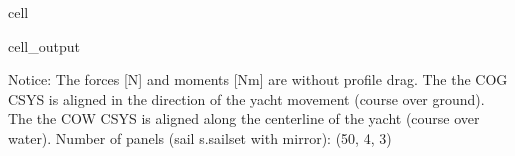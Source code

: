 \documentclass[a4paper,12pt,english]{jupyterBook}
\begin{document}
\begin{sphinxuseclass}{cell}
\begin{sphinxVerbatimOutput}
\begin{sphinxuseclass}{cell_output}
\begin{sphinxVerbatim}[commandchars=\\\{\}]
\PYGZhy{}\PYGZhy{}\PYGZhy{}\PYGZhy{}\PYGZhy{}\PYGZhy{}\PYGZhy{}\PYGZhy{}\PYGZhy{}\PYGZhy{}\PYGZhy{}\PYGZhy{}\PYGZhy{}\PYGZhy{}\PYGZhy{}\PYGZhy{}\PYGZhy{}\PYGZhy{}\PYGZhy{}\PYGZhy{}\PYGZhy{}\PYGZhy{}\PYGZhy{}\PYGZhy{}\PYGZhy{}\PYGZhy{}\PYGZhy{}\PYGZhy{}\PYGZhy{}\PYGZhy{}\PYGZhy{}\PYGZhy{}\PYGZhy{}\PYGZhy{}\PYGZhy{}\PYGZhy{}\PYGZhy{}\PYGZhy{}\PYGZhy{}\PYGZhy{}\PYGZhy{}\PYGZhy{}\PYGZhy{}\PYGZhy{}\PYGZhy{}\PYGZhy{}\PYGZhy{}\PYGZhy{}\PYGZhy{}\PYGZhy{}\PYGZhy{}\PYGZhy{}\PYGZhy{}\PYGZhy{}\PYGZhy{}\PYGZhy{}\PYGZhy{}\PYGZhy{}\PYGZhy{}\PYGZhy{}\PYGZhy{}
Notice:
	The forces [N] and moments [Nm] are without profile drag.
	The the \PYGZus{}COG\PYGZus{} CSYS is aligned in the direction of the yacht movement (course over ground).
	The the \PYGZus{}COW\PYGZus{} CSYS is aligned along the centerline of the yacht (course over water).
	Number of panels (sail s.sail\PYGZus{}set with mirror): (50, 4, 3)
\end{sphinxVerbatim}


\end{sphinxuseclass}
\end{sphinxVerbatimOutput}
\end{sphinxuseclass}
\end{document}

